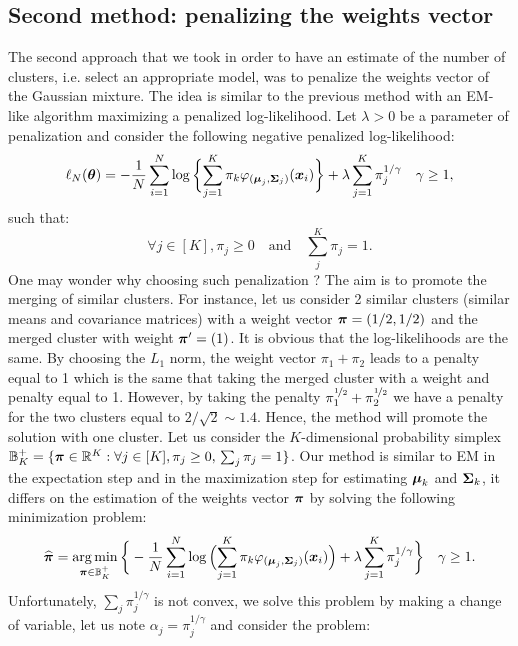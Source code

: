 \subsection{Second method: penalizing the weights vector}
\label{sparse_weight_vect_estim}
The second approach that we took in order to have an estimate of the number of clusters, i.e. select an appropriate model, was to penalize the weights vector of the Gaussian mixture. The idea is similar to the previous method with an EM-like algorithm maximizing a penalized log-likelihood. Let $\lambda > 0$ be a parameter of penalization and consider the following negative penalized log-likelihood:
\begin{equation}
  \ell_N({\boldsymbol\theta})=
-\frac{1}{N}\sum_{i=1}^{N}\log\bigg\{{\sum_{j=1}^K\pi_k\varphi_{(\boldsymbol\mu_{j},\boldsymbol\Sigma_{j})}(\boldsymbol x_i)}\bigg\}+\lambda\sum_{j=1}^{K}\pi_j^{1/\gamma}\quad \gamma\geq1,
\end{equation}
such that:
\begin{equation}
  \forall j\in[K], \pi_j \geq 0 \quad \text{and} \quad \sum_{j}^{K}\pi_j=1.
\end{equation}
One may wonder why choosing such penalization ? The aim is to promote the merging of similar clusters. For instance, let us consider 2 similar clusters (similar means and covariance matrices) with a weight vector $\boldsymbol \pi=(1/2, 1/2)$ and the merged cluster with weight $\boldsymbol \pi'=(1)$. It is obvious that the log-likelihoods are the same. By choosing the $L_1$ norm, the weight vector $\pi_1+\pi_2$ leads to a penalty equal to 1 which is the same that taking the merged cluster with a weight and penalty equal to 1. However, by taking the penalty $\pi_1^{\nicefrac{1}{2}}+\pi_2^{\nicefrac{1}{2}}$ we have a penalty for the two clusters equal to $2/\sqrt{2}\sim 1.4$. Hence, the method will promote the solution with one cluster. Let us consider the $K$-dimensional probability simplex ${\mathbb B}^+_K=\{\boldsymbol \pi\in {\mathbb R}^K: \forall j\in[K], \pi_j \geq 0,\,  \sum_{j}\pi_j=1\}$. Our method is similar to EM in the expectation step and in the maximization step for estimating $\boldsymbol\mu_k$ and $\boldsymbol\Sigma_k$, it differs on the estimation of the weights vector $\boldsymbol \pi$ by solving the following minimization problem:
\begin{equation}
  \widehat{\boldsymbol \pi}= \operatorname*{arg\,min}_{\boldsymbol \pi\in{\mathbb B}^+_K}\bigg\{
-\frac{1}{N}\sum_{i=1}^{N}\log\Big({\sum_{j=1}^K\pi_k\varphi_{(\boldsymbol\mu_{j},\boldsymbol\Sigma_{j})}(\boldsymbol x_i)}\Big)+\lambda\sum_{j=1}^{K}\pi_j^{1/\gamma}\bigg\} \quad \gamma\geq1.
\end{equation}
Unfortunately, $\sum_{j}\pi_j^{1/\gamma}$ is not convex, we solve this problem by making a change of variable, let us note $\alpha_j = \pi_j^{1/\gamma}$ and consider the problem:

